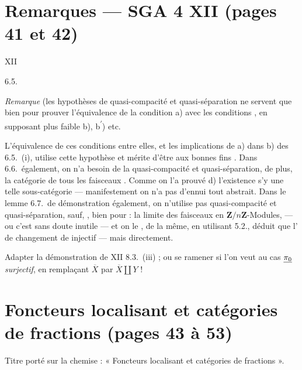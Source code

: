 \documentclass[11pt,a4paper]{article}
\begin{document}
\section*{Remarques — SGA 4 XII (pages 41 et 42)}


XII

 6.5.

\emph{Remarque} (les hypothèses de quasi-compacité et quasi-séparation ne
servent que bien \struck{\ill{}} pour prouver l'équivalence de la condition
a) avec les conditions \ill{}, en supposant plus faible b), b\textsuperscript{$'$})
etc.

L'équivalence de ces conditions entre elles, et les implications de a)
\struck{\ill{}} dans b) \ill{} des 6.5.\ (i), \ill{} utilise \ill{} cette
hypothèse et mérite d'être \ill{} aux bonnes fins \ill{}. Dans 6.6.\ également,
on n'a \ill{} besoin de la quasi-compacité et quasi-séparation, \ill{} de plus,
la catégorie de tous les faisceaux \ill{}. Comme on l'a prouvé \ill{} d)
l'existence s'y  \ill{} une telle sous-catégorie —
manifestement on n'a pas d'ennui \ill{} tout abstrait. Dans le lemme 6.7.\ de
démonstration également, on n'utilise pas \ill{} quasi-compacité et
quasi-séparation, sauf, , bien pour : la limite \ill{} des
faisceaux en $\mathbf{Z}/n\mathbf{Z}$-Modules, — ou c'est sans doute inutile
\struck{\ill{}} — et on le , de la même, en utilisant
 5.2., \ill{} déduit que l'\ill{} de changement de \ill{}
injectif — mais \ill{} directement.


Adapter la démonstration de XII 8.3.\ (iii) ; ou se ramener si l'on veut au
cas $\uncertain{\pi_{0}}$ \emph{surjectif}, en remplaçant $\overline{X}$ par
$\overline{X} \amalg Y$ !

\section*{Foncteurs localisant et catégories de fractions (pages 43 à 53)}

Titre porté sur la chemise : « Foncteurs localisant et catégories de
fractions ».
\end{document}
